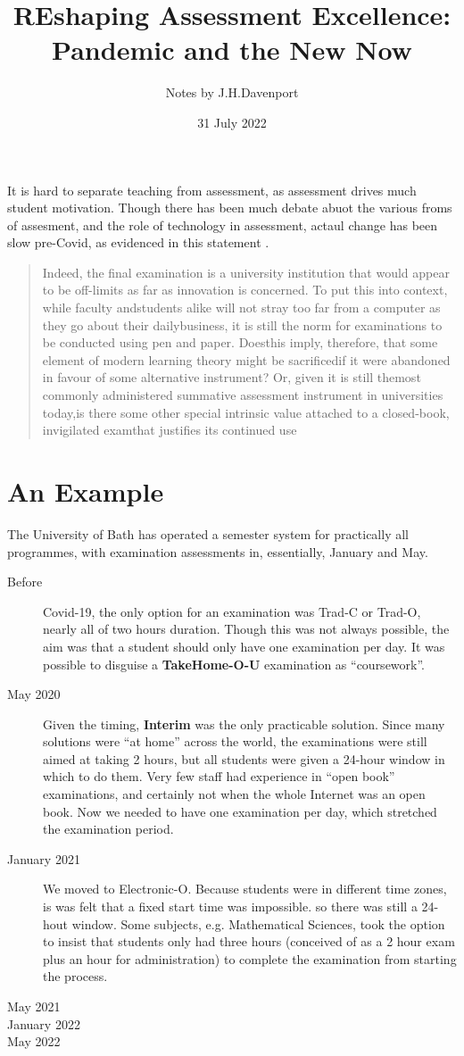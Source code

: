 \documentclass{article}
\begin{document}
\author{Notes by J.H.Davenport}
\title{REshaping Assessment Excellence: Pandemic and the New Now}
\date{31 July 2022}
\maketitle
It is hard to separate teaching from assessment, as assessment drives much student motivation. Though there has been much debate abuot the various froms of assesment, and the role of technology in assessment, actaul change has been slow pre-Covid, as evidenced in this statement \cite{WilliamsWong2009a}.
\begin{quote}
Indeed, the final examination is a university institution that would appear to be off-limits as far as innovation is concerned. To put this into context, while faculty andstudents alike will not stray too far from a computer as they go about their dailybusiness, it is still the norm for examinations to be conducted using pen and paper. Doesthis imply, therefore, that some element of modern learning theory might be sacrificedif it were abandoned in favour of some alternative instrument? Or, given it is still themost commonly administered summative assessment instrument in universities today,is there some other special intrinsic value attached to a closed-book, invigilated examthat justifies its continued use
\end{quote}

\section{An Example}
The University of Bath has operated a semester system for practically all programmes, with examination assessments in, essentially, January and May.
\begin{description}
\item[Before]Covid-19, the only option for an examination was Trad-C or Trad-O, nearly all of two hours duration. Though this was not always possible, the aim was that a student should only have one examination per day. It was possible to disguise a {\bf TakeHome-O-U} examination as ``coursework''.
\item[May 2020]Given the timing, {\bf Interim} was the only practicable solution. Since many solutions were ``at home'' across the world, the examinations were still aimed at taking 2 hours, but all students were given a 24-hour window in which to do them. Very few staff had experience in ``open book'' examinations, and certainly not when the whole Internet was an open book. Now we needed to have one examination per day, which stretched the examination period.
\item[January 2021]We moved to Electronic-O. Because students were in different time zones, is was felt that a fixed start time was impossible. so there was still a 24-hout window. Some subjects, e.g. Mathematical Sciences, took the option to insist that students only had three hours (conceived of as a 2 hour exam plus an hour for administration) to complete the examination from starting the process.
\item[May 2021]
\item[January 2022]
\item[May 2022]
\end{description}
\def\r{$\rightarrow$}
\end{document}
